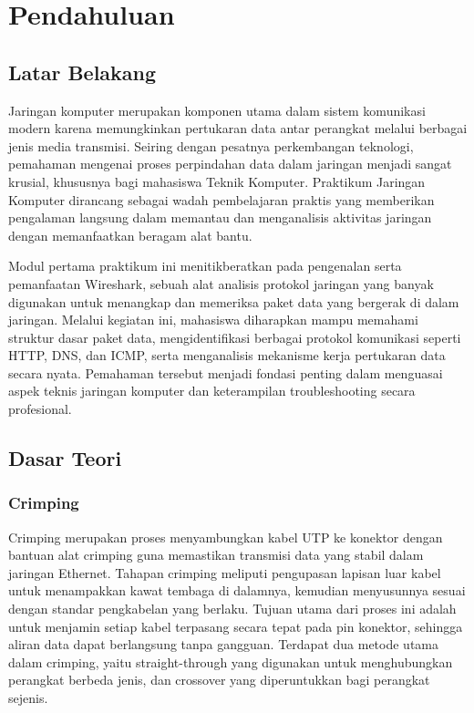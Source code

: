 \section{Pendahuluan}
\subsection{Latar Belakang}
Jaringan komputer merupakan komponen utama dalam sistem komunikasi modern karena memungkinkan pertukaran data antar perangkat melalui berbagai jenis media transmisi. Seiring dengan pesatnya perkembangan teknologi, pemahaman mengenai proses perpindahan data dalam jaringan menjadi sangat krusial, khususnya bagi mahasiswa Teknik Komputer. Praktikum Jaringan Komputer dirancang sebagai wadah pembelajaran praktis yang memberikan pengalaman langsung dalam memantau dan menganalisis aktivitas jaringan dengan memanfaatkan beragam alat bantu.

Modul pertama praktikum ini menitikberatkan pada pengenalan serta pemanfaatan Wireshark, sebuah alat analisis protokol jaringan yang banyak digunakan untuk menangkap dan memeriksa paket data yang bergerak di dalam jaringan. Melalui kegiatan ini, mahasiswa diharapkan mampu memahami struktur dasar paket data, mengidentifikasi berbagai protokol komunikasi seperti HTTP, DNS, dan ICMP, serta menganalisis mekanisme kerja pertukaran data secara nyata. Pemahaman tersebut menjadi fondasi penting dalam menguasai aspek teknis jaringan komputer dan keterampilan troubleshooting secara profesional.



\subsection{Dasar Teori}
\subsubsection{Crimping}
Crimping merupakan proses menyambungkan kabel UTP ke konektor dengan bantuan alat crimping guna memastikan transmisi data yang stabil dalam jaringan Ethernet. Tahapan crimping meliputi pengupasan lapisan luar kabel untuk menampakkan kawat tembaga di dalamnya, kemudian menyusunnya sesuai dengan standar pengkabelan yang berlaku. Tujuan utama dari proses ini adalah untuk menjamin setiap kabel terpasang secara tepat pada pin konektor, sehingga aliran data dapat berlangsung tanpa gangguan. Terdapat dua metode utama dalam crimping, yaitu straight-through yang digunakan untuk menghubungkan perangkat berbeda jenis, dan crossover yang diperuntukkan bagi perangkat sejenis.

